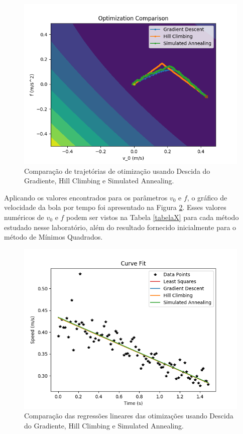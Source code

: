 \documentclass[conference]{IEEEtran}
\begin{document}
\begin{figure}[htbp]
\centering
\centerline{\includegraphics[scale=0.4]{optimization_comparison.png}}
\caption{Comparação de trajetórias de otimização usando Descida do Gradiente, Hill Climbing e Simulated Annealing.}
\label{optimization_comparison}
\end{figure}

Aplicando os valores encontrados para os parâmetros $v_0$ e $f$, o gráfico de velocidade da bola por tempo foi apresentado na Figura \ref{fit_comparison}. Esses valores numéricos de $v_0$ e $f$ podem ser vistos na Tabela \ref{tabelaX} para cada método estudado nesse laboratório, além do resultado fornecido inicialmente para o método de Mínimos Quadrados.

\begin{figure}[H]
\centering
\centerline{\includegraphics[scale=0.4]{fit_comparison.png}}
\caption{Comparação das regressões lineares das otimizações usando Descida do Gradiente, Hill Climbing e Simulated Annealing.}
\label{fit_comparison}
\end{figure}
\end{document}
